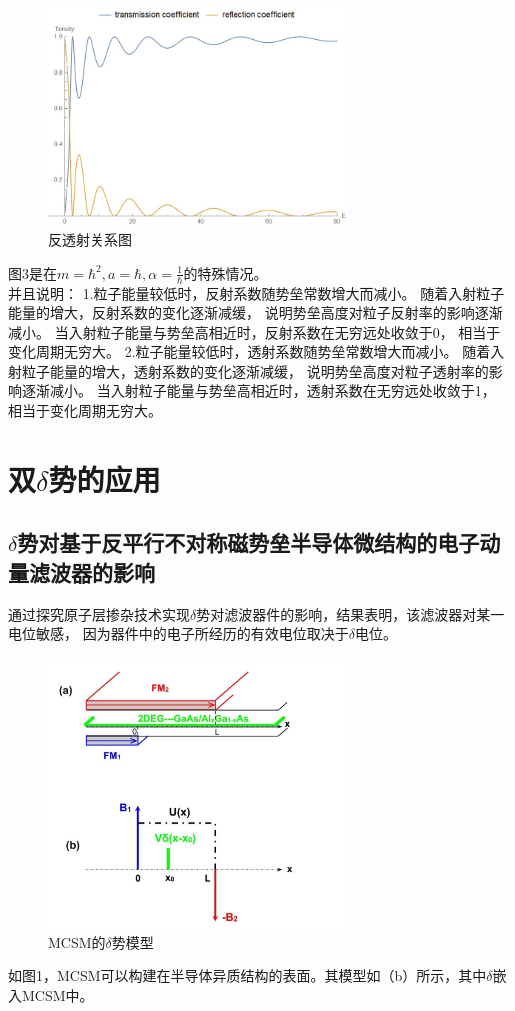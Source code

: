 \documentclass[12pt, a4paper, oneside]{ctexart}
\begin{document}
\begin{spacing}{2.0}
\begin{figure}[htbp]
    \centering
    \includegraphics[width=8cm]{transreflect.jpg}
    \caption{反透射关系图}
\end{figure}
图3是在$m=\hbar^2,a=\hbar,\alpha=\frac{1}{\hbar}$的特殊情况。\\
并且说明：
1.粒子能量较低时，反射系数随势垒常数增大而减小。
随着入射粒子能量的增大，反射系数的变化逐渐减缓，
说明势垒高度对粒子反射率的影响逐渐减小。
当入射粒子能量与势垒高相近时，反射系数在无穷远处收敛于0，
相当于变化周期无穷大。
2.粒子能量较低时，透射系数随势垒常数增大而减小。
随着入射粒子能量的增大，透射系数的变化逐渐减缓，
说明势垒高度对粒子透射率的影响逐渐减小。
当入射粒子能量与势垒高相近时，透射系数在无穷远处收敛于1，
相当于变化周期无穷大。\cite{key}
\section{双$\delta$势的应用}
\subsection{$\delta$势对基于反平行不对称磁势垒半导体微结构的电子动量滤波器的影响}
\cite{QIN2021127571}通过探究原子层掺杂技术实现$\delta$势对滤波器件的影响，结果表明，该滤波器对某一电位敏感，
因为器件中的电子所经历的有效电位取决于$\delta$电位。
	
\begin{figure}[htbp]
	\centering
	\includegraphics[width=8cm]{alpha123.jpg}
	\caption{MCSM的$\delta$势模型}
\end{figure}
如图1，MCSM可以构建在半导体异质结构的表面。其模型如（b）所示，其中$\delta$嵌入MCSM中。
	

\end{spacing}
\end{document}
